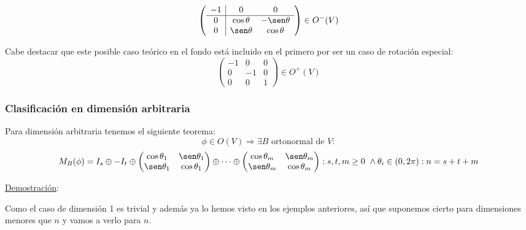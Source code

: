 \documentclass[10pt,a4paper,openright]{book}
\theoremstyle{break}
\begin{document}
$$\left(\begin{array}{c|cc}
-1  & 0 & 0 \\
\hline
0  & \cos\theta & -\sen\theta \\
0 & \sen\theta & \cos\theta
\end{array}
\right)  \in O^- (V)$$

Cabe destacar que este posible caso teórico en el fondo está incluido en el primero por ser un caso de rotación especial:
$$\left(\begin{array}{c|cc}
-1  & 0 & 0 \\
\hline
0  & -1 & 0 \\
0 & 0 & 1 
\end{array}
\right)  \in O^+ (V)$$

\subsubsection*{Clasificación en dimensión arbitraria}

Para dimensión arbitraria tenemos el siguiente teorema:
$$\phi\in O(V)\Rightarrow \exists B \mbox{ ortonormal de }V: $$
$$M_B(\phi) = I_s \oplus -I_t \oplus \begin{pmatrix} \cos \theta_1 & \sen \theta_1 \\ \sen \theta_1 & \cos \theta_1\end{pmatrix} \oplus \cdots \oplus \begin{pmatrix} \cos \theta_m & \sen \theta_m \\ \sen \theta_m & \cos \theta_m\end{pmatrix}: s,t,m \geq 0 \ \wedge \theta_i \in (0,2\pi): n = s+t+m$$

\underline{Demostración}:

Como el caso de dimensión 1 es trivial y además ya lo hemos visto en los ejemplos anteriores, así que suponemos cierto para dimensiones menores que $n$ y vamos a verlo para $n$.
\end{document}
